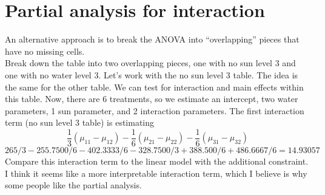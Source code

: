 \documentclass[
]{book}
\begin{document}
\hypertarget{partial-analysis-for-interaction}{%
\section{Partial analysis for interaction}\label{partial-analysis-for-interaction}}

An alternative approach is to break the ANOVA into ``overlapping'' pieces that have no missing cells.\\
Break down the table into two overlapping pieces, one with no sun level 3 and one with no water level 3. Let's work with the no sun level 3 table. The idea is the same for the other table. We can test for interaction and main effects within this table. Now, there are 6 treatments, so we estimate an intercept, two water parameters, 1 sun parameter, and 2 interaction parameters.
The first interaction term (no sun level 3 table) is estimating
\[\frac{1}{3}(\mu_{11} -\mu_{12}) -  \frac{1}{6}(\mu_{21}- \mu_{22}) - \frac{1}{6}(\mu_{31} - \mu_{32})\]
\[265/3 - 255.7500/6 - 402.3333/6-328.7500/3+388.500/6+486.6667/6=14.93057\]
Compare this interaction term to the linear model with the additional constraint. I think it seems like a more interpretable interaction term, which I believe is why some people like the partial analysis.
\end{document}
